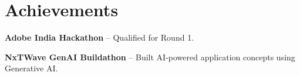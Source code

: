 \section{Achievements}

\small

\textbf{Adobe India Hackathon} -- Qualified for Round 1.

\vspace{2pt}

\textbf{NxTWave GenAI Buildathon} -- Built AI-powered application concepts using Generative AI.

\vspace{-4pt}